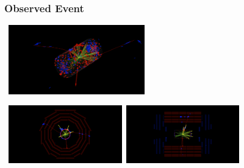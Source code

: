 \documentclass{beamer}
\begin{document}
\begin{frame}
\frametitle{Observed Event}
\begin{tcolorbox}[colback=UNL@Cream!5,colframe=UNL@LightGrey!40,title=\textcolor{UMN@Maroon}{\textbf{3-D View}}]
 \centering
\mbox{
\includegraphics[height=3cm,width= 0.7\paperwidth]{THESISPLOTS/Delayed_photon-Event-3D.png}} 
 \end{tcolorbox}
 
 \begin{tcolorbox}[colback=UNL@Cream!5,colframe=UNL@LightGrey!40,title=\textcolor{UMN@Maroon}{\textbf{Transverse~(left) and $\rho-Z$ (Right) View}}]
 \centering
\mbox{
\includegraphics[height=2.5cm,width=0.35\paperwidth]{THESISPLOTS/Delayed_photon_Event-Rho-Phi.png}
 \quad
\includegraphics[height=2.5cm,width=0.35\paperwidth]{THESISPLOTS/Delayed_photon_Event-Rho-Z.png}
} 
 \end{tcolorbox}

\end{frame}
\end{document}
